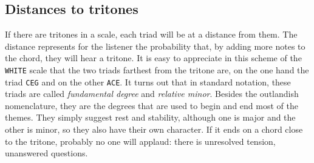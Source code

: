 \documentclass[]{report}
\begin{document}
\subsection{Distances to tritones}
If there are tritones in a scale, each triad will be at a distance from them. The distance represents for the listener the probability that, by adding more notes to the chord, they will hear a tritone. It is easy to appreciate in this scheme of the \texttt{WHITE} scale that the two triads farthest from the tritone are, on the one hand the triad \texttt{CEG} and on the other \texttt{ACE}.
It turns out that in standard notation, these triads are called \emph{fundamental degree} and \emph{relative minor}. Besides the outlandish nomenclature, they are the degrees that are used to begin and end most of the themes. They simply suggest rest and stability, although one is major and the other is minor, so they also have their own character. If it ends on a chord close to the tritone, probably no one will applaud: there is unresolved tension, unanswered questions.
\end{document}
